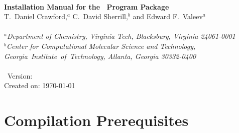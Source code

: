 \documentclass[12pt]{article}
\begin{document}


\begin{center}
\ \\
\vspace{2.0in}
{\bf {\Large Installation Manual for the \PSIfour\ Program Package}} \\
\vspace{0.5in}
T.\ Daniel Crawford,$^a$ C.\ David Sherrill,$^b$ and Edward F.\ Valeev$^{a}$ 
\\ \  \\
{\em $^a$Department of Chemistry, Virginia Tech, Blacksburg, 
Virginia 24061-0001} \\
\vspace{0.1in}
{\em $^b$Center for Computational Molecular Science and Technology, 
\mbox{Georgia Institute of Technology,} Atlanta, Georgia 30332-0400} \\
\vspace{0.1in}
\ \\
\vspace{0.3in}
\PSIfour\ Version: \PSIversion \\
Created on: \today
\end{center}

\thispagestyle{empty}

\newpage
\section{Compilation Prerequisites}
\end{document}
